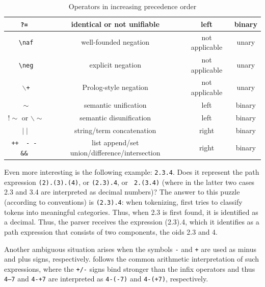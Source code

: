 \documentclass[11pt]{article}
\newcommand{\ERGO}{\mbox{\smaller{\ensuremath{\cal{E}}\smaller{{\sc{RGO}}}}}\xspace}
\newcommand{\FLSYSTEM}{\ERGO}
\newcommand{\bs}{\textbackslash}
\newcommand{\RULELOGNAF}{{\texttt{{\bs}naf}}\xspace}
\newcommand{\RULELOGNEG}{{\texttt{{\bs}neg}}\xspace}
\begin{document}
\begin{table}[htb]
{\begin{tabular}{|c|c|c|c|}
\tt ?= & identical or not unifiable & left & binary \\ \hline
 \RULELOGNAF & well-founded negation & not applicable & unary \\ \cline{1-4}
 \RULELOGNEG & explicit negation & not applicable & unary \\ \cline{1-4}
 \texttt{$\backslash$+} & Prolog-style negation & not applicable & unary \\ \hline
 \texttt{$\sim$} & semantic unification & left & binary \\ \cline{1-4}
 \texttt{$!\sim$} or \texttt{$\backslash\sim$} & semantic disunification & left & binary \\ \hline
 \texttt{$\mid\mid$} & string/term concatenation & right & binary \\ \hline
\tt ++~ -\,-~ \&\& & list append/set union/difference/intersection & right & binary \\ \cline{1-4}
\hline
\end{tabular}
}
\caption{Operators in increasing precedence order}
\label{tab:tab-op-pre}
\end{table}

Even more interesting is the following example: {\tt 2.3.4}. Does it
represent the path expression {\tt (2).(3).(4)}, or {\tt (2.3).4}, or {\tt
  2.(3.4)} (where in the latter two cases 2.3 and 3.4 are interpreted as
decimal numbers)? The answer to this puzzle (according to \FLSYSTEM conventions)
is {\tt (2.3).4}: when
tokenizing, \FLSYSTEM first tries to classify tokens into meaningful
categories. Thus, when 2.3 is first found, it is identified as a
decimal. Thus, the parser receives the expression (2.3).4, which it
identifies as a path expression that consists of two components, the oids
2.3 and 4.

Another ambiguous situation arises when the symbols {\tt -} and {\tt +} are
used as minus and plus
signs, respectively. \FLSYSTEM follows the common arithmetic interpretation of
such expressions, where the {\tt +/-} signs bind stronger than the infix
operators and thus
{\tt 4--7} and {\tt 4-+7} are interpreted as {\tt 4-(-7)} and {\tt 4-(+7)},
respectively.
\end{document}
